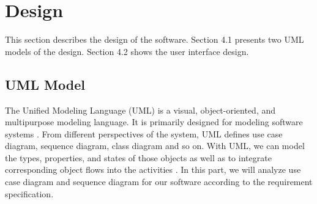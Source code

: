 \documentclass[paper=a4, fontsize=11pt,twoside]{scrartcl}		%
\begin{document}
\section{Design}
This section describes the design of the software. Section 4.1 presents two UML models of the design.  Section 4.2 shows the user interface design.

\subsection{UML Model}
The Unified Modeling Language (UML) is a visual, object-oriented, and multipurpose modeling language. It is primarily designed for modeling software systems \cite{Gregor20055}. From different perspectives of the system, UML defines use case diagram, sequence diagram, class diagram and so on. With UML, we can model the types, properties, and states of those objects as well as to integrate corresponding object flows into the activities \cite{Gregor20055}. In this part, we will analyze use case diagram and sequence diagram for our software according to the requirement specification.
\end{document}
